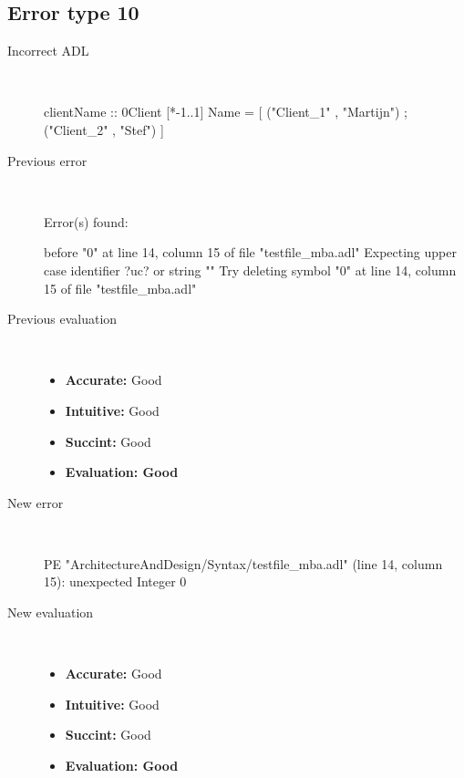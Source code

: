 \hrulefill

\subsection{Error type 10}
  \begin{description}
  \item[Incorrect ADL]~\\
\begin{adl}
clientName :: 0Client [*-1..1] Name =
    [ ("Client_1"      , "Martijn")
    ; ("Client_2"      , "Stef")
    ]\end{adl}
  \item[Previous error]~\\
\begin{haskell}
Error(s) found:

before "0" at line 14, column 15 of file "testfile_mba.adl"
Expecting upper case identifier ?uc? or string ""
Try deleting symbol "0" at line 14, column 15 of file "testfile_mba.adl"\end{haskell}
  \item[Previous evaluation]~\\
    \begin{itemize}
    \item \textbf{Accurate:} Good
    \item \textbf{Intuitive:} Good
    \item \textbf{Succint:} Good
    \item \textbf{Evaluation: Good}
    \end{itemize}
  \item[New error]~\\
\begin{haskell}
PE "ArchitectureAndDesign/Syntax/testfile_mba.adl" (line 14, column 15):
unexpected Integer 0\end{haskell}
  \item[New evaluation]~\\
    \begin{itemize}
    \item \textbf{Accurate:} Good
    \item \textbf{Intuitive:} Good
    \item \textbf{Succint:} Good
    \item \textbf{Evaluation: Good
}
    \end{itemize}
  \end{description}

\hrulefill

